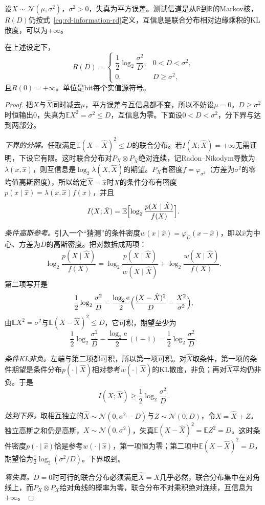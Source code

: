 设$X\sim\mathcal{N}(\mu,\sigma^{2})$，$\sigma^{2}>0$，失真为平方误差。测试信道是从$\mathbb{R}$到$\mathbb{R}$的Markov核，$R(D)$仍按式~\eqref{eq:rd-information-rd}定义，互信息是联合分布相对边缘乘积的KL散度，可以为$+\infty$。

\begin{theorem}[高斯信源的率失真函数]
\label{thm:rd-gaussian}
在上述设定下，
\begin{equation}
  R(D)=\begin{cases}
    \dfrac12\log_2\dfrac{\sigma^{2}}{D}, & 0<D<\sigma^{2},\\
    0, & D\geq\sigma^{2},
  \end{cases}
  \label{eq:rd-gaussian}
\end{equation}
且$R(0)=+\infty$。单位是bit每个实值源符号。
\end{theorem}

\begin{proof}
把$X$与$\hat{X}$同时减去$\mu$，平方误差与互信息都不变，所以不妨设$\mu=0$。$D\geq\sigma^{2}$时恒输出$0$，失真为$\mathbb{E}X^{2}=\sigma^{2}\leq D$，互信息为零。下面设$0<D<\sigma^{2}$，分下界与达到两部分。

\emph{下界的分解。}任取满足$\mathbb{E}(X-\hat{X})^{2}\leq D$的联合分布。若$I(X;\hat{X})=+\infty$无需证明，下设它有限。这时联合分布对$P_X\otimes P_{\hat{X}}$绝对连续，记Radon–Nikodym导数为$\lambda(x,\hat{x})$，则互信息是$\log_2\lambda(X,\hat{X})$的期望。$P_X$有密度$f=\varphi_{\sigma^{2}}$（方差为$\sigma^{2}$的零均值高斯密度），所以给定$\hat{X}=\hat{x}$时$X$的条件分布有密度$p(x\mid\hat{x})=\lambda(x,\hat{x})f(x)$，并且
\[
  I(X;\hat{X})=\mathbb{E}\Bigl[\log_2\frac{p(X\mid\hat{X})}{f(X)}\Bigr].
\]

\emph{条件高斯参考。}引入一个“猜测”的条件密度$w(x\mid\hat{x})=\varphi_D(x-\hat{x})$，即以$\hat{x}$为中心、方差为$D$的高斯密度。把对数拆成两项：
\[
  \log_2\frac{p(X\mid\hat{X})}{f(X)}=\log_2\frac{p(X\mid\hat{X})}{w(X\mid\hat{X})}+\log_2\frac{w(X\mid\hat{X})}{f(X)} .
\]
第二项写开是
\[
  \frac12\log_2\frac{\sigma^{2}}{D}-\frac{\log_2\mathrm{e}}{2}\Bigl(\frac{(X-\hat{X})^{2}}{D}-\frac{X^{2}}{\sigma^{2}}\Bigr),
\]
由$\mathbb{E}X^{2}=\sigma^{2}$与$\mathbb{E}(X-\hat{X})^{2}\leq D$，它可积，期望至少为
\[
  \frac12\log_2\frac{\sigma^{2}}{D}-\frac{\log_2\mathrm{e}}{2}\,(1-1)=\frac12\log_2\frac{\sigma^{2}}{D}.
\]

\emph{条件KL非负。}左端与第二项都可积，所以第一项可积。对$\hat{X}$取条件，第一项的条件期望是条件分布$p(\cdot\mid\hat{X})$相对参考$w(\cdot\mid\hat{X})$的KL散度，非负；再对$\hat{X}$平均仍非负。于是
\[
  I(X;\hat{X})\geq\frac12\log_2\frac{\sigma^{2}}{D}.
\]

\emph{达到下界。}取相互独立的$\hat{X}\sim\mathcal{N}(0,\sigma^{2}-D)$与$Z\sim\mathcal{N}(0,D)$，令$X=\hat{X}+Z$。独立高斯之和仍是高斯，$X\sim\mathcal{N}(0,\sigma^{2})$，失真$\mathbb{E}(X-\hat{X})^{2}=\mathbb{E}Z^{2}=D$。这时条件密度$p(\cdot\mid\hat{x})$恰是参考$w(\cdot\mid\hat{x})$，第一项恒为零；第二项中$\mathbb{E}(X-\hat{X})^{2}=D$，期望恰为$\tfrac12\log_2(\sigma^{2}/D)$。下界取到。

\emph{零失真。}$D=0$时可行的联合分布必须满足$\hat{X}=X$几乎必然，联合分布集中在对角线上，而$P_X\otimes P_X$给对角线的概率为零，联合分布不对乘积绝对连续，互信息为$+\infty$。
\end{proof}

